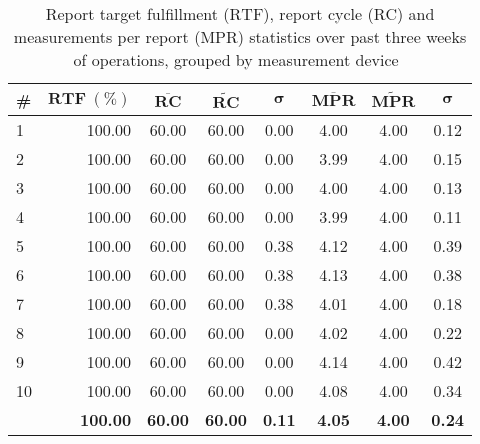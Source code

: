 \begin{appendices}

\FloatBarrier
\newpage

\begin{table}[hbt]
	\centering
  	\begin{tabularx}{\textwidth}{|X|r|c|c|c|c|c|c|}
		\hline
		\textbf{\#}  & $\textbf{RTF}~(\%)$ & $\overline{\textbf{RC}}$ & $\widetilde{\textbf{RC}}$ & $\boldsymbol{\sigma}$ & $\overline{\textbf{MPR}}$ & $\widetilde{\textbf{MPR}}$ & $\boldsymbol{\sigma}$ \\
	    	\hline
	    1 	& 100.00 	& 60.00 & 60.00 & 0.00 & 4.00 & 4.00 & 0.12 \\ %
	    	\hline
	    	2 	& 100.00	& 60.00 & 60.00 & 0.00 & 3.99 & 4.00 & 0.15 \\ %
	    	\hline
	    	3 	& 100.00 	& 60.00 & 60.00 & 0.00 & 4.00 & 4.00 & 0.13 \\ %
	    \hline
	    	4 	& 100.00 	& 60.00 & 60.00 & 0.00 & 3.99 & 4.00 & 0.11 \\ %
	    	\hline
	    5 	& 100.00	& 60.00 & 60.00 & 0.38 & 4.12 & 4.00 & 0.39 \\ %
	    	6 	& 100.00 	& 60.00 & 60.00 & 0.38 & 4.13 & 4.00 & 0.38 \\ %
	    	\hline
	    7 	& 100.00	& 60.00 & 60.00 & 0.38 & 4.01 & 4.00 & 0.18 \\ %
	    \hline
	    	8 	& 100.00 	& 60.00 & 60.00 & 0.00 & 4.02 & 4.00 & 0.22 \\ %
	    	\hline
	    9 	& 100.00 	& 60.00 & 60.00 & 0.00 & 4.14 & 4.00 & 0.42 \\ %
	    	10 	& 100.00 	& 60.00 & 60.00 & 0.00 & 4.08 & 4.00 & 0.34 \\ %
	    	\hline
	    	\hline
	    	& \textbf{100.00} & \textbf{60.00} & \textbf{60.00} & \textbf{0.11} & \textbf{4.05} & \textbf{4.00} & \textbf{0.24} \\
	    	\hline
	\end{tabularx}
  	\caption[Report statistics, grouped by measurement device]{Report target fulfillment ($\text{RTF}$), report cycle ($\text{RC}$) and measurements per report ($\text{MPR}$) statistics over past three weeks of operations, grouped by measurement device~\footnotemark}
  	\label{tab:report-cycle-statistics}
\end{table}


\end{appendices}
